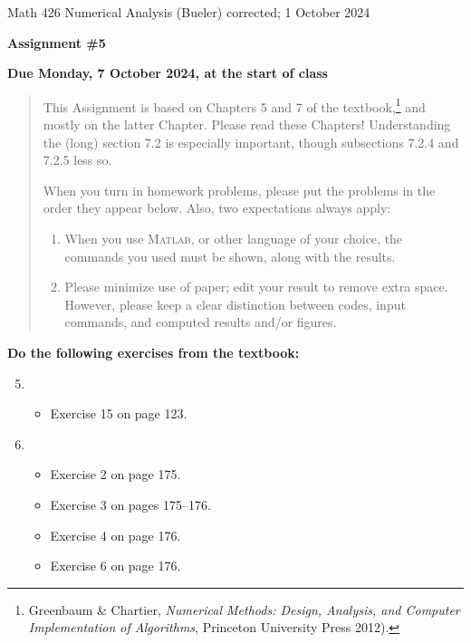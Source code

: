 \documentclass[12pt]{amsart}
\newcommand{\Matlab}{\textsc{Matlab}\xspace}
\begin{document}
\scriptsize \noindent Math 426 Numerical Analysis (Bueler) \hfill {\color{BrickRed} corrected; 1 October 2024}
\normalsize

\medskip\bigskip

\Large\centerline{\textbf{Assignment \#5}}
\large
\bigskip

\centerline{\textbf{Due Monday, 7 October 2024, at the start of class}}
\medskip
\normalsize

\thispagestyle{empty}

\begin{quote}
{\small
This Assignment is based on Chapters 5 and 7 of the textbook,\footnote{Greenbaum \& Chartier, \emph{Numerical Methods: Design, Analysis, and Computer Implementation of Algorithms}, Princeton University Press 2012).} and mostly on the latter Chapter.  Please read these Chapters!  Understanding the (long) section 7.2 is especially important, though subsections 7.2.4 and 7.2.5 less so.

\medskip
\noindent When you turn in homework problems, please put the problems in the order they appear below.  Also, two expectations always apply:
\renewcommand{\labelenumi}{\arabic{enumi}.\,}
\begin{enumerate}
\item When you use \Matlab, or other language of your choice, the commands you used must be shown, along with the results.
\item Please minimize use of paper; edit your result to remove extra space.  However, please keep a clear distinction between codes, input commands, and computed results and/or figures.
\end{enumerate}
}
\end{quote}

\bigskip
\noindent \textbf{Do the following exercises from the textbook:}

\medskip
\renewcommand{\labelenumi}{{\footnotesize\underline{\textsc{Chapter \arabic{enumi}}}}}
\begin{enumerate}
\setcounter{enumi}{4}
\item ~
    \begin{itemize}
    \item Exercise 15 on page 123.
    \end{itemize}
\setcounter{enumi}{6}
\item ~
    \begin{itemize}
    \item Exercise 2 on page 175.
    \item Exercise 3 on pages 175--176.
    \item Exercise 4 on page 176.
    \item Exercise 6 on page 176.
    \end{itemize}
\end{enumerate}
\end{document}
